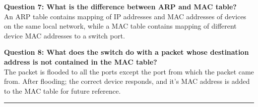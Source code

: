 \documentclass[a4paper,12pt]{article}
\begin{document}
\textbf{Question 7: What is the difference between ARP and MAC table?} \\
An ARP table contains mapping of IP addresses and MAC addresses of devices on the same local network, while a MAC table contains mapping of different device MAC addresses to a switch port.

\textbf{Question 8: What does the switch do with a packet whose destination address is not contained in the MAC table?}\\
The packet is flooded to all the ports except the port from which the packet came from. After flooding; the correct device responds, and it's MAC address is added to the MAC table for future reference.



\vspace{1em}
\hrule
\vspace{0.5em}
\end{document}
